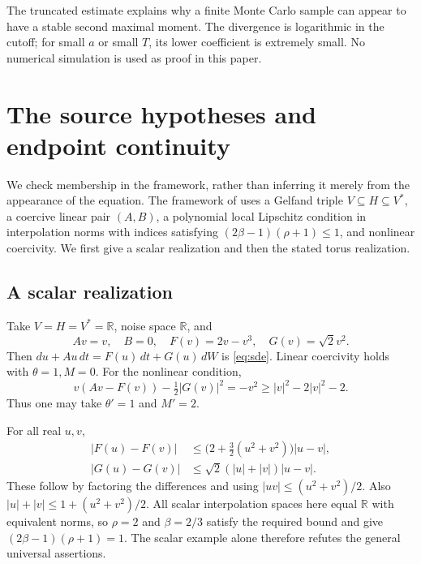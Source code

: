 \documentclass[11pt]{article}
\theoremstyle{remark}\newtheorem{remark}[theorem]{Remark}
\newcommand{\R}{\mathbb R}\newcommand{\T}{\mathbb T}
\begin{document}
The truncated estimate explains why a finite Monte Carlo sample can appear to have a stable second maximal moment. The divergence is logarithmic in the cutoff; for small $a$ or small $T$, its lower coefficient is extremely small. No numerical simulation is used as proof in this paper.

\section{The source hypotheses and endpoint continuity}
We check membership in the framework, rather than inferring it merely from the appearance of the equation. The framework of \cite{AV25} uses a Gelfand triple $V\subseteq H\subseteq V^*$, a coercive linear pair $(A,B)$, a polynomial local Lipschitz condition in interpolation norms with indices satisfying $(2\beta-1)(\rho+1)\le1$, and nonlinear coercivity. We first give a scalar realization and then the stated torus realization.

\subsection{A scalar realization}
Take $V=H=V^*=\R$, noise space $\R$, and
\[
 A v=v,\quad B=0,\quad F(v)=2v-v^3,\quad G(v)=\sqrt2 v^2.
\]
Then $du+Au\,dt=F(u)\,dt+G(u)\,dW$ is \eqref{eq:sde}. Linear coercivity holds with $\theta=1,M=0$. For the nonlinear condition,
\begin{equation}\label{eq:coercivity}
 v(Av-F(v))-\tfrac12|G(v)|^2=-v^2
 \ge |v|^2-2|v|^2-2.
\end{equation}
Thus one may take $\theta'=1$ and $M'=2$.

For all real $u,v$,
\begin{align*}
 |F(u)-F(v)|&\le\bigl(2+\tfrac32(u^2+v^2)\bigr)|u-v|,\\
 |G(u)-G(v)|&\le\sqrt2(|u|+|v|)|u-v|.
\end{align*}
These follow by factoring the differences and using $|uv|\le(u^2+v^2)/2$. Also $|u|+|v|\le1+(u^2+v^2)/2$. All scalar interpolation spaces here equal $\R$ with equivalent norms, so $\rho=2$ and $\beta=2/3$ satisfy the required bound and give $(2\beta-1)(\rho+1)=1$. The scalar example alone therefore refutes the general universal assertions.
\end{document}
